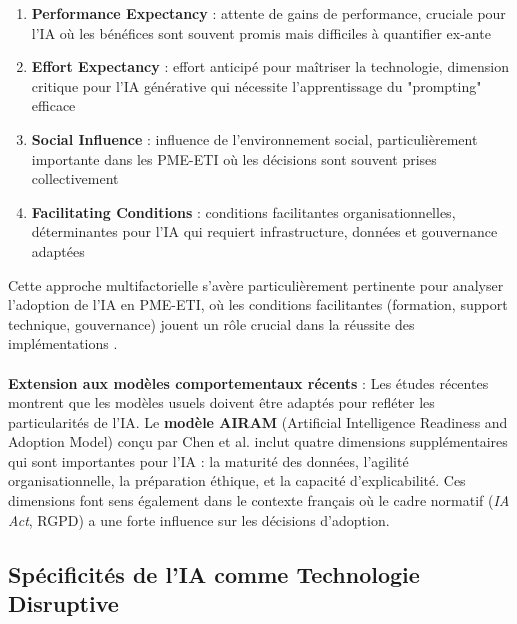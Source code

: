 \begin{enumerate}
    \item \textbf{Performance Expectancy} : attente de gains de performance, cruciale pour l'IA où les bénéfices sont souvent promis mais difficiles à quantifier ex-ante
    \item \textbf{Effort Expectancy} : effort anticipé pour maîtriser la technologie, dimension critique pour l'IA générative qui nécessite l'apprentissage du "prompting" efficace
    \item \textbf{Social Influence} : influence de l'environnement social, particulièrement importante dans les PME-ETI où les décisions sont souvent prises collectivement
    \item \textbf{Facilitating Conditions} : conditions facilitantes organisationnelles, déterminantes pour l'IA qui requiert infrastructure, données et gouvernance adaptées
\end{enumerate}
\medskip
Cette approche multifactorielle s'avère particulièrement pertinente pour analyser l'adoption de l'IA en PME-ETI, où les conditions facilitantes (formation, support technique, gouvernance) jouent un rôle crucial dans la réussite des implémentations \cite{vorecol2024resistance}.
\\\\
\textbf{Extension aux modèles comportementaux récents} : Les études récentes montrent que les modèles usuels doivent être adaptés pour refléter les particularités de l’IA.
Le \textbf{modèle AIRAM} (Artificial Intelligence Readiness and Adoption Model) conçu par Chen et al. \cite{chen2024airam} inclut quatre dimensions supplémentaires qui sont importantes pour l’IA : la maturité des données, l’agilité organisationnelle, la préparation éthique, et la capacité d’explicabilité.  
Ces dimensions font sens également dans le contexte français où le cadre normatif (\textit{IA Act}, RGPD) a une forte influence sur les décisions d’adoption.

\subsection{Spécificités de l'IA comme Technologie Disruptive}

